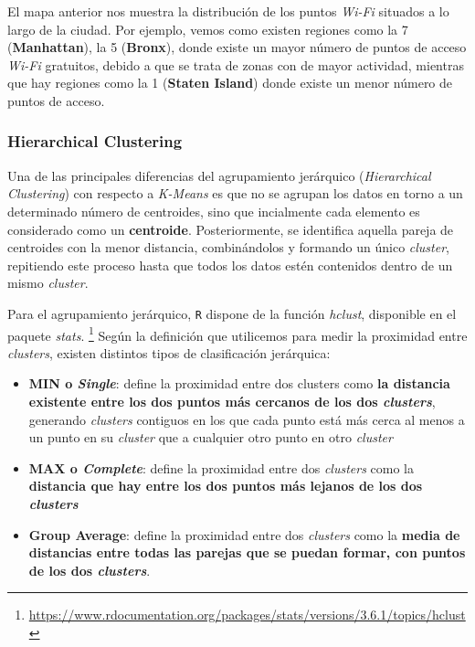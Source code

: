 \documentclass [a4paper] {article}
\begin{document}
\newpage
El mapa anterior nos muestra la distribución de los puntos \textit{Wi-Fi} situados a lo largo de la ciudad. Por ejemplo, vemos como existen regiones como la 7 (\textbf{Manhattan}), la 5 (\textbf{Bronx}), donde existe un mayor número de puntos de acceso \textit{Wi-Fi} gratuitos, debido a que se trata de zonas con de mayor actividad, mientras que hay regiones como la 1 (\textbf{Staten Island}) donde existe un menor número de puntos de acceso.

\subsubsection{Hierarchical Clustering}
Una de las principales diferencias del agrupamiento jerárquico (\textit{Hierarchical Clustering}) con respecto a \textit{K-Means} es que no se agrupan los datos en torno a un determinado número de centroides, sino que incialmente cada elemento es considerado como un \textbf{centroide}. Posteriormente, se identifica aquella pareja de centroides con la menor distancia, combinándolos y formando un único \textit{cluster}, repitiendo este proceso hasta que todos los datos estén contenidos dentro de un mismo \textit{cluster}.

Para el agrupamiento jerárquico, \texttt{R} dispone de la función \textit{hclust}, disponible en el paquete \textit{stats}. \footnote{\url{https://www.rdocumentation.org/packages/stats/versions/3.6.1/topics/hclust}}
Según la definición que utilicemos para medir la proximidad entre \textit{clusters}, existen distintos tipos de clasificación jerárquica:

\begin{itemize}
  \item \textbf{MIN o \textit{Single}}: define la proximidad entre dos clusters como \textbf{la distancia existente entre los dos puntos más cercanos de los dos \textit{clusters}}, generando \textit{clusters} contiguos en los que cada punto está más cerca al menos a un punto en su \textit{cluster} que a cualquier otro punto en otro \textit{cluster}
  \item \textbf{MAX o \textit{Complete}}: define la proximidad entre dos \textit{clusters} como la \textbf{distancia que hay entre los dos puntos más lejanos de los dos \textit{clusters}}
  \item \textbf{Group Average}: define la proximidad entre dos \textit{clusters} como la \textbf{media de distancias entre todas las parejas que se puedan formar, con puntos de los dos \textit{clusters}}.
\end{itemize}
\end{document}

